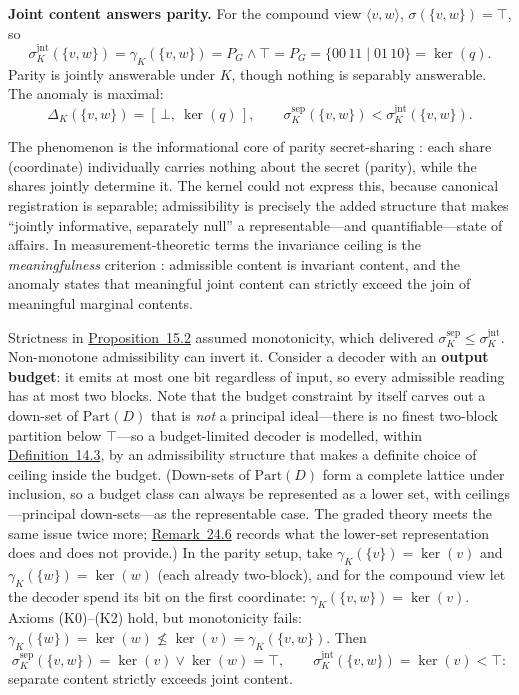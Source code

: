 \textbf{Joint content answers parity.} For the compound view \(\langle v,w\rangle\), \(\sigma(\{v,w\})=\top\), so
\[
\sigma^{\mathrm{jnt}}_K(\{v,w\})=\gamma_K(\{v,w\})=P_G\wedge\top=P_G=\{00\,11\mid01\,10\}=\ker(q).
\]
Parity is jointly answerable under \(K\), though nothing is separably answerable. The anomaly is maximal:
\[
\Delta_K(\{v,w\})=[\,\bot,\ \ker(q)\,],\qquad \sigma^{\mathrm{sep}}_K(\{v,w\}) < \sigma^{\mathrm{jnt}}_K(\{v,w\}).
\]

The phenomenon is the informational core of parity secret-sharing \autocite{shamir1979}: each share (coordinate) individually carries nothing about the secret (parity), while the shares jointly determine it. The kernel could not express this, because canonical registration is separable; admissibility is precisely the added structure that makes ``jointly informative, separately null'' a representable---\hspace{0pt}and quantifiable---\hspace{0pt}state of affairs. In measurement-theoretic terms the invariance ceiling is the \emph{meaningfulness} criterion \autocite{krantz1971,narens2002}: admissible content is invariant content, and the anomaly states that meaningful joint content can strictly exceed the join of meaningful marginal contents.


Strictness in \hyperlink{stmt:15.2}{Proposition~15.2} assumed monotonicity, which delivered \(\sigma^{\mathrm{sep}}_K\le\sigma^{\mathrm{jnt}}_K\). Non-monotone admissibility can invert it. Consider a decoder with an \textbf{output budget}: it emits at most one bit regardless of input, so every admissible reading has at most two blocks. Note that the budget constraint by itself carves out a down-set of \(\mathrm{Part}(D)\) that is \emph{not} a principal ideal---\hspace{0pt}there is no finest two-block partition below \(\top\)---\hspace{0pt}so a budget-limited decoder is modelled, within \hyperlink{stmt:14.3}{Definition~14.3}, by an admissibility structure that makes a definite choice of ceiling inside the budget. (Down-sets of \(\mathrm{Part}(D)\) form a complete lattice under inclusion, so a budget class can always be represented as a lower set, with ceilings---\hspace{0pt}principal down-sets---\hspace{0pt}as the representable case. The graded theory meets the same issue twice more; \hyperlink{stmt:24.6}{Remark~24.6} records what the lower-set representation does and does not provide.) In the parity setup, take \(\gamma_K(\{v\})=\ker(v)\) and \(\gamma_K(\{w\})=\ker(w)\) (each already two-block), and for the compound view let the decoder spend its bit on the first coordinate: \(\gamma_K(\{v,w\})=\ker(v)\). Axioms (K0)--(K2) hold, but monotonicity fails: \(\gamma_K(\{w\})=\ker(w)\not\le\ker(v)=\gamma_K(\{v,w\})\). Then
\[
\sigma^{\mathrm{sep}}_K(\{v,w\})=\ker(v)\vee\ker(w)=\top,
\qquad
\sigma^{\mathrm{jnt}}_K(\{v,w\})=\ker(v)<\top:
\]
separate content strictly exceeds joint content.

